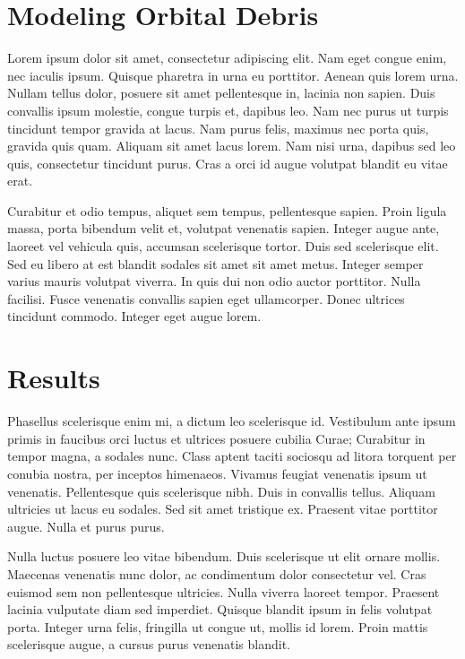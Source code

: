 \documentclass[11pt]{article}
\begin{document}
\begin{multicols*}{2}
\section{Modeling Orbital Debris} \label{systems}
Lorem ipsum dolor sit amet, consectetur adipiscing elit. Nam eget congue enim, nec iaculis ipsum. Quisque pharetra in urna eu porttitor. Aenean quis lorem urna. Nullam tellus dolor, posuere sit amet pellentesque in, lacinia non sapien. Duis convallis ipsum molestie, congue turpis et, dapibus leo. Nam nec purus ut turpis tincidunt tempor gravida at lacus. Nam purus felis, maximus nec porta quis, gravida quis quam. Aliquam sit amet lacus lorem. Nam nisi urna, dapibus sed leo quis, consectetur tincidunt purus. Cras a orci id augue volutpat blandit eu vitae erat.

Curabitur et odio tempus, aliquet sem tempus, pellentesque sapien. Proin ligula massa, porta bibendum velit et, volutpat venenatis sapien. Integer augue ante, laoreet vel vehicula quis, accumsan scelerisque tortor. Duis sed scelerisque elit. Sed eu libero at est blandit sodales sit amet sit amet metus. Integer semper varius mauris volutpat viverra. In quis dui non odio auctor porttitor. Nulla facilisi. Fusce venenatis convallis sapien eget ullamcorper. Donec ultrices tincidunt commodo. Integer eget augue lorem.

\section{Results} \label{applications}
Phasellus scelerisque enim mi, a dictum leo scelerisque id. Vestibulum ante ipsum primis in faucibus orci luctus et ultrices posuere cubilia Curae; Curabitur in tempor magna, a sodales nunc. Class aptent taciti sociosqu ad litora torquent per conubia nostra, per inceptos himenaeos. Vivamus feugiat venenatis ipsum ut venenatis. Pellentesque quis scelerisque nibh. Duis in convallis tellus. Aliquam ultricies ut lacus eu sodales. Sed sit amet tristique ex. Praesent vitae porttitor augue. Nulla et purus purus.

Nulla luctus posuere leo vitae bibendum. Duis scelerisque ut elit ornare mollis. Maecenas venenatis nunc dolor, ac condimentum dolor consectetur vel. Cras euismod sem non pellentesque ultricies. Nulla viverra laoreet tempor. Praesent lacinia vulputate diam sed imperdiet. Quisque blandit ipsum in felis volutpat porta. Integer urna felis, fringilla ut congue ut, mollis id lorem. Proin mattis scelerisque augue, a cursus purus venenatis blandit.


\end{multicols*}
\end{document}
